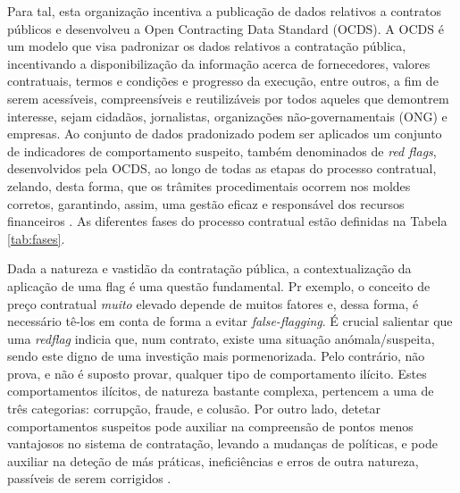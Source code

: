Para tal, esta organização incentiva a publicação de dados relativos a contratos públicos e desenvolveu a Open Contracting Data Standard (OCDS). A OCDS é um modelo que visa padronizar os dados relativos a contratação pública, incentivando a disponibilização da informação acerca de fornecedores, valores contratuais, termos e condições e progresso da execução, entre outros, a fim de serem acessíveis, compreensíveis e reutilizáveis por todos aqueles que demontrem interesse, sejam cidadãos, jornalistas, organizações não-governamentais (ONG) e empresas. Ao conjunto de dados pradonizado podem ser aplicados um conjunto de indicadores de comportamento suspeito, também denominados de \textit{red flags}, desenvolvidos pela OCDS, ao longo de todas as etapas do processo contratual, zelando, desta forma, que os trâmites procedimentais ocorrem nos moldes corretos, garantindo, assim, uma gestão eficaz e responsável dos recursos financeiros \cite{redflags_guide}. As diferentes fases do processo contratual estão definidas na Tabela \ref{tab:fases}.


\begin{table}[ht]
	\centering
	\renewcommand{\arraystretch}{1.2}
	\setlength{\tabcolsep}{15pt}
	\caption{Etapas do processo de contratação pública.}
	\label{tab:fases}
\end{table}


Dada a natureza e vastidão da contratação pública, a contextualização da aplicação de uma flag é uma questão fundamental. Pr exemplo, o conceito de preço contratual \textit{muito} elevado depende de muitos fatores e, dessa forma, é necessário tê-los em conta de forma a evitar \textit{false-flagging}. É crucial salientar que uma \textit{redflag} indicia que, num contrato, existe uma situação anómala/suspeita, sendo este digno de uma investição mais pormenorizada. Pelo contrário, não prova, e não é suposto provar, qualquer tipo de comportamento ilícito. Estes comportamentos ilícitos, de natureza bastante complexa, pertencem a uma de três categorias: corrupção, fraude, e colusão. Por outro lado, detetar comportamentos suspeitos pode auxiliar na compreensão de pontos menos vantajosos no sistema de contratação, levando a mudanças de políticas, e pode auxiliar na deteção de más práticas, ineficiências e erros de outra natureza, passíveis de serem corrigidos \cite{redflags_guide}. 


